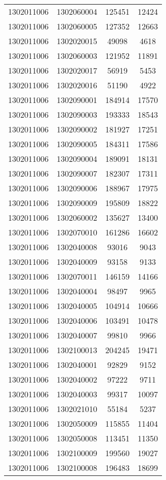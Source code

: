 \begin{longtable}{llcc}
1302011006 & 1302060004 & 125451 & 12424\\
1302011006 & 1302060005 & 127352 & 12663\\
1302011006 & 1302020015 & 49098 & 4618\\
1302011006 & 1302060003 & 121952 & 11891\\
1302011006 & 1302020017 & 56919 & 5453\\
1302011006 & 1302020016 & 51190 & 4922\\
1302011006 & 1302090001 & 184914 & 17570\\
1302011006 & 1302090003 & 193333 & 18543\\
1302011006 & 1302090002 & 181927 & 17251\\
1302011006 & 1302090005 & 184311 & 17586\\
1302011006 & 1302090004 & 189091 & 18131\\
1302011006 & 1302090007 & 182307 & 17311\\
1302011006 & 1302090006 & 188967 & 17975\\
1302011006 & 1302090009 & 195809 & 18822\\
1302011006 & 1302060002 & 135627 & 13400\\
1302011006 & 1302070010 & 161286 & 16602\\
1302011006 & 1302040008 & 93016 & 9043\\
1302011006 & 1302040009 & 93158 & 9133\\
1302011006 & 1302070011 & 146159 & 14166\\
1302011006 & 1302040004 & 98497 & 9965\\
1302011006 & 1302040005 & 104914 & 10666\\
1302011006 & 1302040006 & 103491 & 10478\\
1302011006 & 1302040007 & 99810 & 9966\\
1302011006 & 1302100013 & 204245 & 19471\\
1302011006 & 1302040001 & 92829 & 9152\\
1302011006 & 1302040002 & 97222 & 9711\\
1302011006 & 1302040003 & 99317 & 10097\\
1302011006 & 1302021010 & 55184 & 5237\\
1302011006 & 1302050009 & 115855 & 11404\\
1302011006 & 1302050008 & 113451 & 11350\\
1302011006 & 1302100009 & 199560 & 19027\\
1302011006 & 1302100008 & 196483 & 18699\\

\end{longtable}
